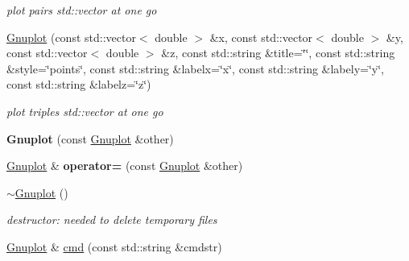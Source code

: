 \begin{DoxyCompactItemize}
\begin{DoxyCompactList}\small\item\em plot pairs std\-::vector at one go \end{DoxyCompactList}\item 
\hypertarget{class_gnuplot_a14191e89154f2716608f6907975cc012}{\hyperlink{class_gnuplot_a14191e89154f2716608f6907975cc012}{Gnuplot} (const std\-::vector$<$ double $>$ \&x, const std\-::vector$<$ double $>$ \&y, const std\-::vector$<$ double $>$ \&z, const std\-::string \&title=\char`\"{}\char`\"{}, const std\-::string \&style=\char`\"{}points\char`\"{}, const std\-::string \&labelx=\char`\"{}x\char`\"{}, const std\-::string \&labely=\char`\"{}y\char`\"{}, const std\-::string \&labelz=\char`\"{}z\char`\"{})}\label{class_gnuplot_a14191e89154f2716608f6907975cc012}

\begin{DoxyCompactList}\small\item\em plot triples std\-::vector at one go \end{DoxyCompactList}\item 
\hypertarget{class_gnuplot_a21bb10ffa0dbf0fd09e28054840c61f9}{{\bfseries Gnuplot} (const \hyperlink{class_gnuplot}{Gnuplot} \&other)}\label{class_gnuplot_a21bb10ffa0dbf0fd09e28054840c61f9}

\item 
\hypertarget{class_gnuplot_a18bcf3e5d5081e50cf1ba8244973e514}{\hyperlink{class_gnuplot}{Gnuplot} \& {\bfseries operator=} (const \hyperlink{class_gnuplot}{Gnuplot} \&other)}\label{class_gnuplot_a18bcf3e5d5081e50cf1ba8244973e514}

\item 
\hypertarget{class_gnuplot_a78a68f621caa87d1f34324fcd093c7bd}{\hyperlink{class_gnuplot_a78a68f621caa87d1f34324fcd093c7bd}{$\sim$\-Gnuplot} ()}\label{class_gnuplot_a78a68f621caa87d1f34324fcd093c7bd}

\begin{DoxyCompactList}\small\item\em destructor\-: needed to delete temporary files \end{DoxyCompactList}\item 
\hypertarget{class_gnuplot_a07607803ede8dd5416906df0a1924fc5}{\hyperlink{class_gnuplot}{Gnuplot} \& \hyperlink{class_gnuplot_a07607803ede8dd5416906df0a1924fc5}{cmd} (const std\-::string \&cmdstr)}\label{class_gnuplot_a07607803ede8dd5416906df0a1924fc5}


\end{DoxyCompactItemize}
